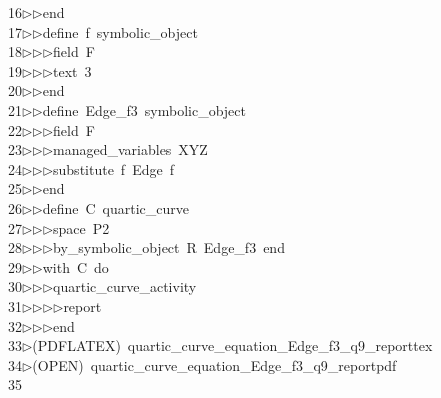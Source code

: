 \begin{tabbing}
16\>$\triangleright$\>$\triangleright$\>end\ \\[0pt]
17\>$\triangleright$\>$\triangleright$\>define\ f\ symbolic\_object\ \\[0pt]
18\>$\triangleright$\>$\triangleright$\>$\triangleright$\>field\ F\ \\[0pt]
19\>$\triangleright$\>$\triangleright$\>$\triangleright$\>text\ 3\ \\[0pt]
20\>$\triangleright$\>$\triangleright$\>end\ \\[0pt]
21\>$\triangleright$\>$\triangleright$\>define\ Edge\_f3\ symbolic\_object\ \\[0pt]
22\>$\triangleright$\>$\triangleright$\>$\triangleright$\>field\ F\ \\[0pt]
23\>$\triangleright$\>$\triangleright$\>$\triangleright$\>managed\_variables\ XYZ\ \\[0pt]
24\>$\triangleright$\>$\triangleright$\>$\triangleright$\>substitute\ f\ Edge\ f\ \\[0pt]
25\>$\triangleright$\>$\triangleright$\>end\ \\[0pt]
26\>$\triangleright$\>$\triangleright$\>define\ C\ quartic\_curve\ \\[0pt]
27\>$\triangleright$\>$\triangleright$\>$\triangleright$\>space\ P2\ \\[0pt]
28\>$\triangleright$\>$\triangleright$\>$\triangleright$\>by\_symbolic\_object\ R\ Edge\_f3\ end\ \\[0pt]
29\>$\triangleright$\>$\triangleright$\>with\ C\ do\ \\[0pt]
30\>$\triangleright$\>$\triangleright$\>$\triangleright$\>quartic\_curve\_activity\ \\[0pt]
31\>$\triangleright$\>$\triangleright$\>$\triangleright$\>$\triangleright$\>report\ \\[0pt]
32\>$\triangleright$\>$\triangleright$\>$\triangleright$\>end\\[0pt]
33\>$\triangleright$\>(PDFLATEX)\ quartic\_curve\_equation\_Edge\_f3\_q9\_reporttex\\[0pt]
34\>$\triangleright$\>(OPEN)\ quartic\_curve\_equation\_Edge\_f3\_q9\_reportpdf\\[0pt]
35\>\end{tabbing}
